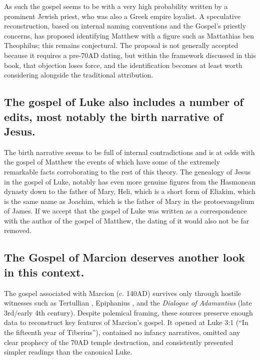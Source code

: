 As such the gospel seems to be with a very high probability written by a prominent Jewish priest, who was also a Greek empire loyalist.
A speculative reconstruction, based on internal naming conventions and the Gospel's priestly concerns, has proposed identifying Matthew with a figure such as Mattathias ben Theophilus; this remains conjectural.
The proposal is not generally accepted because it requires a pre-70AD dating, but within the framework discussed in this book, that objection loses force, and the identification becomes at least worth considering alongside the traditional attribution.

\subsection{The gospel of Luke also includes a number of edits, most notably the birth narrative of Jesus.}\label{subsec:the-gospel-of-luke-also-includes-a-number-of-edits-most-notably-the-birth-narrative-of-jesus.}

The birth narrative seems to be full of internal contradictions and is at odds with the gospel of Matthew the events of which have some of the extremely remarkable facts corroborating to the rest of this theory.
The genealogy of Jesus in the gospel of Luke, notably has even more genuine figures from the Hasmonean dynasty down to the father of Mary, Heli, which is a short form of Eliakim, which is the same name as Joachim, which is the father of Mary in the protoevangelium of James.
If we accept that the gospel of Luke was written as a correspondence with the author of the gospel of Matthew, the dating of it would also not be far removed.

\subsection{The Gospel of Marcion deserves another look in this context.}\label{subsec:the-gospel-of-marcion-deserves-another-look-in-this-context.}

The gospel associated with Marcion (c. 140AD) survives only through hostile witnesses such as Tertullian \cite{tertullian:marcionem}, Epiphanius \cite[42]{epiphanius:panarion}, and the \emph{Dialogue of Adamantius} (late 3rd/early 4th century).
Despite polemical framing, these sources preserve enough data to reconstruct key features of Marcion’s gospel.
It opened at Luke 3:1 (“In the fifteenth year of Tiberius”), contained no infancy narratives, omitted any clear prophecy of the 70AD temple destruction, and consistently presented simpler readings than the canonical Luke.

